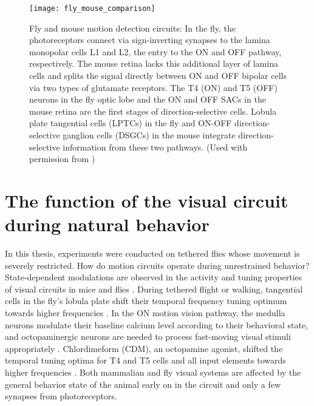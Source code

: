 \begin{figure}
\centering
\hspace*{-1cm} 
\texttt{[image: fly\_mouse\_comparison]}
\caption[Fly and mouse motion detection circuits] {Fly and mouse motion detection circuits: In the fly, the photoreceptors connect via sign-inverting synapses to the lamina monopolar cells L1 and L2, the entry to the ON and OFF pathway, respectively. The mouse retina lacks this additional layer of lamina cells and splits the signal directly between ON and OFF bipolar cells via two types of glutamate receptors. The T4 (ON) and T5 (OFF) neurons in the fly optic lobe and the ON and OFF SACs in the mouse retina are the first stages of direction-selective cells. Lobula plate tangential cells (LPTCs) in the fly and ON-OFF direction-selective ganglion cells (DSGCs) in the mouse integrate direction-selective information from these two pathways. (Used with permission from \cite{Borst2015})} 
\label{fig:flymouse}
\end{figure}

\section{The function of the visual circuit during natural behavior}
In this thesis, experiments were conducted on tethered flies whose movement is severely restricted. How do motion circuits operate during unrestrained behavior? State-dependent modulations are observed in the activity and tuning properties of visual circuits in mice and flies \parencite{Maimon2011}. During tethered flight or walking, tangential cells in the fly's lobula plate shift their temporal frequency tuning optimum towards higher frequencies \parencite{Chiappe2010, Maimon2010, Jung2011}. In the ON motion vision pathway, the medulla neurons modulate their baseline calcium level according to their behavioral state, and octopaminergic neurons are needed to process fast-moving visual stimuli appropriately \parencite{Strother2018}. Chlordimeform (CDM), an octopamine agonist, shifted the temporal tuning optima for T4 and T5 cells and all input elements towards higher frequencies \parencite{Arenz2017}. Both mammalian and fly visual systems are affected by the general behavior state of the animal early on in the circuit and only a few synapses from photoreceptors.

